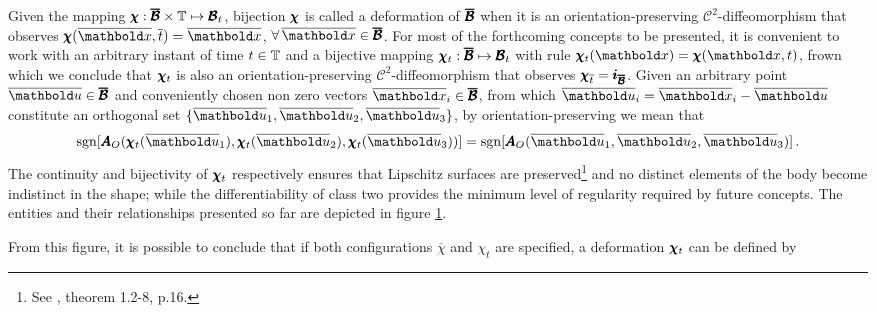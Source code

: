 Given the mapping $\pmb{\chi} : \pmb{\overline{\mathcal{B}}}\times\mathbb{T} \mapsto \pmb{\mathcal{B}}_t$, bijection $\pmb{\chi}$ is called a deformation of $\pmb{\overline{\mathcal{B}}}$ when it is an orientation-preserving $\mathcal{C}^{2}$-diffeomorphism that observes $\fua{\tnr{\chi}}{\overline{\vto{x}},\overline{t}}=\overline{\vto{x}}$, $\forall\,\overline{\vto{x}}\in\tnr{\overline{\mathcal{B}}}$. For most of the forthcoming concepts to be presented, it is convenient to work with an arbitrary instant of time $t\in\mathbb{T}$ and a bijective mapping $\pmb{\chi}_t : \pmb{\overline{\mathcal{B}}} \mapsto \pmb{\mathcal{B}}_t$ with rule $\fua{\tnr{\chi}_t}{\vto{x}}=\fua{\tnr{\chi}}{\vto{x},t}$, frown which we conclude that $\pmb{\chi}_t$ is also an orientation-preserving $\mathcal{C}^{2}$-diffeomorphism that observes $\pmb{\chi}_{\overline{t}}=\pmb{i}_{\pmb{\overline{\mathcal{B}}}}$. Given an arbitrary point $\overline{\vto{u}}\in\tnr{\overline{\mathcal{B}}}$ and conveniently chosen non zero vectors $\overline{\vto{x}}_i\in\tnr{\overline{\mathcal{B}}}$, from which $\overline{\vto{u}}_i=\overline{\vto{x}}_i-\overline{\vto{u}}$ constitute an orthogonal set $\{ \overline{\vto{u}}_1,\overline{\vto{u}}_2,\overline{\vto{u}}_3\}$, by orientation-preserving we mean that   
\begin{equation}\label{eq:orientPreserv}
\mathop{\mathrm{sgn}}[\fua{\tnr{A}_O}{\fua{\tnr{\chi}_t}{\overline{\vto{u}}_1},\fua{\tnr{\chi}_t}{\overline{\vto{u}}_2},\fua{\tnr{\chi}_t}{\overline{\vto{u}}_3}}]=\mathop{\mathrm{sgn}}[\fua{\tnr{A}_O}{\overline{\vto{u}}_1,\overline{\vto{u}}_2,\overline{\vto{u}}_3}]\,.
\end{equation}
The continuity and bijectivity of $\pmb{\chi}_t$ respectively ensures that Lipschitz surfaces are preserved\footnote{See \cite{ciarlet_1988_2_2}, theorem 1.2-8, p.16.} and no distinct elements of the body become indistinct in the shape; while the differentiability of class two provides the minimum level of regularity required by future concepts. The entities and their relationships presented so far are depicted in figure \ref{fg:deformacao}. 
\begin{figure}[!ht]
\centering
\begin{center}
\scalebox{.72}{}
\end{center}
\label{fg:deformacao}
\end{figure}
From this figure, it is possible to conclude that if both configurations $\overline{\chi}$ and $\chi_t$ are specified, a deformation $\pmb{\chi}_t$ can be defined by 
